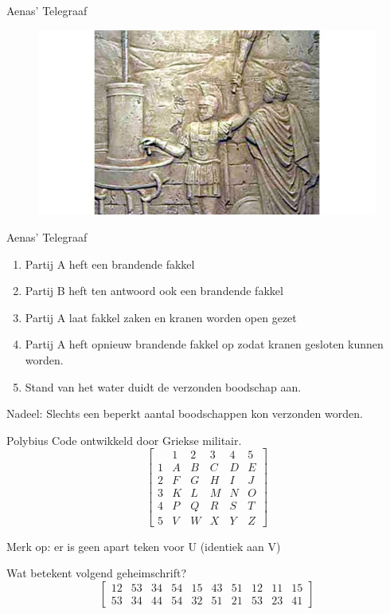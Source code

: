 \documentclass{beamer}
\begin{document}


\begin{frame}{Aenas' Telegraaf}
\begin{figure}
	\includegraphics[width=\textwidth]{img/aenas.jpg}
\end{figure}
\end{frame}

\begin{frame}{Aenas' Telegraaf}
\begin{enumerate}
\item Partij A heft een brandende fakkel
\item Partij B heft ten antwoord ook een brandende fakkel
\item Partij A laat fakkel zaken en kranen worden open gezet
\item Partij A heft opnieuw brandende fakkel op zodat kranen gesloten kunnen worden.
\item Stand van het water duidt de verzonden boodschap aan.
\end{enumerate}

\pause 
Nadeel: Slechts een beperkt aantal boodschappen kon verzonden worden.
\end{frame}




\begin{frame}{Polybius}
	Code ontwikkeld door Griekse militair.
	\[ \begin{bmatrix}
		  & 1  & 2  & 3  & 4  & 5\\ 
		1 & A  & B  & C  & D  & E\\ 
		2 & F  & G  & H  & I  & J \\ 
		3 & K  & L  & M  & N  & O \\ 
		4 & P  & Q  & R  & S  & T\\ 
		5 & V  & W  & X  & Y  & Z  
	\end{bmatrix}  \]
	
	\pause Merk op: er is geen apart teken voor U (identiek aan V)
	
	\pause
	Wat betekent volgend geheimschrift?
	\[ \begin{bmatrix}
12 & 53 & 34 & 54 & 15 & 43 & 51 & 12 & 11 & 15 \\ 
53 & 34 & 44 & 54 & 32 & 51 & 21 & 53 &23 &41 
\end{bmatrix} \]
\end{frame}
\end{document}
